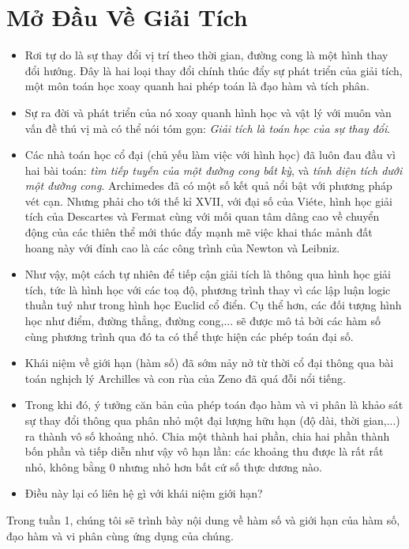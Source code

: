   
\chapter{Mở Đầu Về Giải Tích}

\begin{itemize}
    \item Rơi tự do là sự thay đổi vị trí theo thời gian, đường cong là một hình thay đổi hướng. Đây là hai loại thay đổi chính thúc đẩy sự phát triển của giải tích, một môn toán học xoay quanh hai phép toán là đạo hàm và tích phân.
    \item Sự ra đời và phát triển của nó xoay quanh hình học và vật lý với muôn vàn vấn đề thú vị  mà có thể nói tóm gọn: \emph{Giải tích là toán học của sự thay đổi}.
    \item Các nhà toán học cổ đại (chủ yếu làm việc với hình học) đã luôn đau đầu vì hai bài toán:\emph{ tìm tiếp tuyến của một đường cong bất kỳ}, và \emph{tính diện tích dưới một đường cong}. Archimedes đã có một số kết quả nổi bật với phương pháp vét cạn.
     Nhưng phải cho tới thế kỉ XVII, với đại số của Viéte, hình học giải tích của Descartes và Fermat cùng với mối quan tâm dâng cao về chuyển động của các thiên thể mới thúc đẩy mạnh mẽ việc khai thác mảnh đất hoang này với đỉnh cao là các công trình của Newton và Leibniz.

    \item Như vậy, một cách tự nhiên để tiếp cận giải tích là thông qua hình học giải tích, tức là hình học với các toạ độ, phương trình thay vì các lập luận logic thuần tuý như trong hình học Euclid cổ điển. Cụ thể hơn, các đối tượng hình học như điểm, đường thẳng, đường cong,... sẽ được mô tả bởi các hàm số cùng phương trình qua đó ta có thể thực hiện các phép toán đại số.
    \item Khái niệm về giới hạn (hàm số) đã sớm nảy nở từ thời cổ đại thông qua bài toán nghịch lý Archilles và con rùa của Zeno đã quá đỗi nổi tiếng. 
    \item Trong khi đó, ý tưởng căn bản của phép toán đạo hàm và vi phân là khảo sát sự thay đổi thông qua phân nhỏ một đại lượng hữu hạn (độ dài, thời gian,...) ra thành vô số khoảng nhỏ. Chia một thành hai phần, chia hai phần thành bốn phần và tiếp diễn như vậy vô hạn lần: các khoảng thu được là rất rất nhỏ, không bằng 0 nhưng nhỏ hơn bất cứ số thực dương nào.
    \item Điều này lại có liên hệ gì với khái niệm giới hạn?

\end{itemize}
\noindent Trong tuần 1, chúng tôi sẽ trình bày nội dung về hàm số và giới hạn của hàm số, đạo hàm và vi phân cùng ứng dụng của chúng.
\newpage

